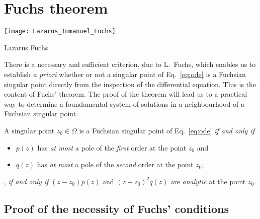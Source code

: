 
\section{Fuchs theorem}

\begin{sidefigure}
   \texttt{[image: Lazarus\_Immanuel\_Fuchs]}
   \caption{Lazarus Fuchs}
\end{sidefigure}

There is a necessary and sufficient criterion, due to L.~Fuchs, which enables us to establish  \emph{a priori} whether or not a singular point of
Eq.~\eqref{eq:ode} is a Fuchsian singular point directly from the inspection  of
the differential equation. This is the content of Fuchs' theorem. The proof of
the theorem will lead us to a practical way to determine a foundamental system
of solutions in a neighbourhood of a Fuchsian singular point.

\begin{theorem}
   A %
   singular point 
   $z_{0}\in \Omega$ is a Fuchsian singular point of Eq.~\eqref{eq:ode} \emph{if
      and only if} 
   \begin{itemize}
      \item $p(z)$ has \emph{at most} a pole of the \emph{first} order at the point
	 $z_{0}$ and
      \item $q(z)$ has \emph{at most} a pole of the \emph{second} order at the point
	 $z_{0}$;
   \end{itemize}
   \ie, \emph{if and only if}
   $(z-z_{0}) p(z)$ and $(z-z_{0})^{2} q(z)$ are \emph{analytic} at the point
   $z_{0}$.
\end{theorem}


\subsection{Proof of the necessity of Fuchs' conditions}


